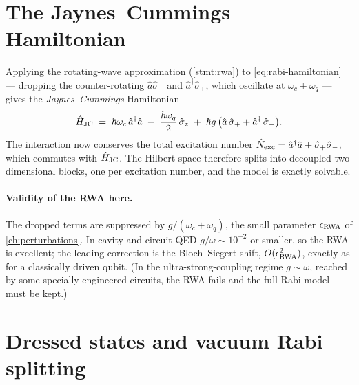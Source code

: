 \section{The Jaynes--Cummings Hamiltonian}
\label{sec:jc-hamiltonian}

\begin{statement}
\label{stmt:jaynes-cummings}
Applying the rotating-wave approximation (\cref{stmt:rwa}) to
\cref{eq:rabi-hamiltonian} --- dropping the counter-rotating
$\hat a\hat\sigma_-$ and $\hat a^\dagger\hat\sigma_+$, which
oscillate at $\omega_c+\omega_q$ --- gives the
\emph{Jaynes--Cummings} Hamiltonian
\begin{equation}
\label{eq:jc-hamiltonian}
\hat{H}_{\rm JC} \;=\; \hbar\omega_c\,\hat a^\dagger\hat a
\;-\; \frac{\hbar\omega_q}{2}\,\hat\sigma_z
\;+\; \hbar g\,\bigl(\hat a\,\hat\sigma_+ + \hat a^\dagger\,\hat\sigma_-\bigr).
\end{equation}
The interaction now conserves the total excitation number
$\hat{N}_{\rm exc}=\hat a^\dagger\hat a + \hat\sigma_+\hat\sigma_-$,
which commutes with $\hat{H}_{\rm JC}$. The Hilbert space therefore
splits into decoupled two-dimensional blocks, one per excitation
number, and the model is exactly solvable.
\end{statement}

\paragraph{Validity of the RWA here.}
The dropped terms are suppressed by $g/(\omega_c+\omega_q)$, the
small parameter $\epsilon_{\rm RWA}$ of \cref{ch:perturbations}. In
cavity and circuit QED $g/\omega\sim10^{-2}$ or smaller, so the RWA
is excellent; the leading correction is the Bloch--Siegert shift,
$O(\epsilon_{\rm RWA}^2)$, exactly as for a classically driven qubit.
(In the ultra-strong-coupling regime $g\sim\omega$, reached by some
specially engineered circuits, the RWA fails and the full Rabi model
must be kept.)

\section{Dressed states and vacuum Rabi splitting}
\label{sec:dressed-states}


